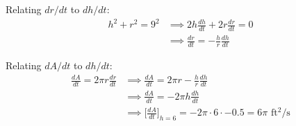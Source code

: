 \documentclass[nooutcomes]{ximera}
\renewenvironment{freeResponse}{
\ifhandout\setbox0\vbox\bgroup\else
\begin{trivlist}\item[\hskip \labelsep\bfseries Solution:\hspace{2ex}]
\fi}
{\ifhandout\egroup\else
\end{trivlist}
\fi}
\newcommand{\eval}[1]{\bigg[ #1 \bigg]}
\begin{document}
\begin{problem}
\begin{freeResponse}
    Relating $dr/dt$ to $dh/dt$:
    \begin{align*}
      h^2 + r^2 = 9^2 &\implies 2h\frac{dh}{dt} + 2r\frac{dr}{dt} = 0\\
                      &\implies \frac{dr}{dt} = -\frac{h}{r}\frac{dh}{dt}
    \end{align*}

    Relating $dA/dt$ to $dh/dt$:
    \begin{align*}
      \frac{dA}{dt} = 2\pi r \frac{dr}{dt} & \implies \frac{dA}{dt} = 2\pi r -\frac{h}{r}\frac{dh}{dt} \\
      &\implies \frac{dA}{dt} = -2\pi h \frac{dh}{dt} \\
      &\implies \eval{\frac{dA}{dt}}_{h = 6} = -2\pi \cdot 6 \cdot -0.5 = 6 \pi \mbox{ ft$^2$/s}
    \end{align*}
  \end{freeResponse}
\end{problem}
\end{document}
